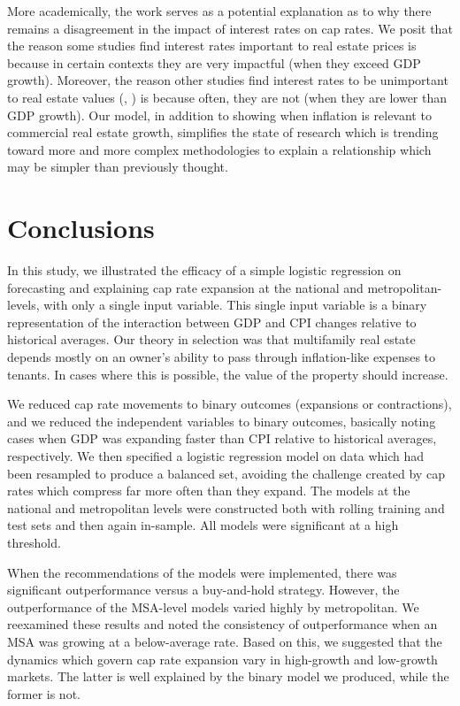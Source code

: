 \documentclass[jrfm,article,accept,oneauthor,pdftex]{Definitions/mdpi}
\begin{document}
More academically, the work serves as a potential explanation as to why there remains a disagreement in the impact of interest rates on cap rates. We posit that the reason some studies find interest rates important to real estate prices \citep{aizenman2009current} is because in certain contexts they are very impactful (when they exceed GDP growth). Moreover, the reason other studies find interest rates to be  unimportant to real estate values (\cite{quan1997commercial}, \cite{larriva2021determinants}) is because often, they are not (when they are lower than GDP growth). Our model, in addition to showing when inflation is relevant to commercial real estate growth, simplifies the state of research which is trending toward more and more complex methodologies \citep{christopoulos2020synthetic} to explain a relationship which may be simpler than previously thought. 

\section{Conclusions}

In this study, we illustrated the efficacy of a simple logistic regression on forecasting and explaining cap rate expansion at the national and metropolitan-levels, with only a single input variable. This single input variable is a binary representation of the interaction between GDP and CPI changes relative to historical averages. Our theory in selection was that multifamily real estate depends mostly on an owner's ability to pass through inflation-like expenses to tenants. In cases where this is possible, the value of the property should increase.

We reduced cap rate movements to binary outcomes (expansions or contractions), and we reduced the independent variables to binary outcomes, basically noting cases when GDP was expanding faster than CPI relative to historical averages, respectively. We then specified a logistic regression model on data which had been resampled to produce a balanced set, avoiding the challenge created by cap rates which compress far more often than they expand. The models at the national and metropolitan levels were constructed both with rolling training and test sets and then again in-sample. All models were significant at a high threshold. 

When the recommendations of the models were implemented, there was significant outperformance versus a buy-and-hold strategy. However, the outperformance of the MSA-level models varied highly by metropolitan. We reexamined these results and noted the consistency of outperformance when an MSA was growing at a below-average rate. Based on this, we suggested that the dynamics which govern cap rate expansion vary in high-growth and low-growth markets. The latter is well explained by the binary model we produced, while the former is not. 
\end{document}
